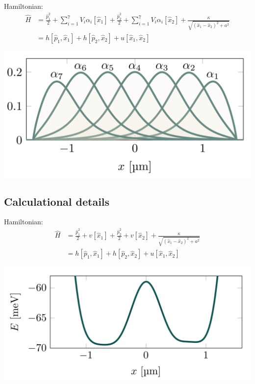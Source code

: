 \documentclass[%
oneside,                 %
final,                   %
10pt]{article}
\begin{document}
Hamiltonian:
\begin{align}
\hat{H} &=\frac{\hat{p}_1^2}{2} + \sum_{i = 1}^7 V_i\alpha_i[\hat{x}_1] + \frac{\hat{p}_2^2}{2} + \sum_{i = 1}^7 V_i\alpha_i[\hat{x}_2] + \frac{\kappa}{\sqrt{(\hat{x}_1-\hat{x}_2)^2 + a^2}}\\
&= h[\hat{p}_1,\hat{x}_1] + h[\hat{p}_2,\hat{x}_2] + u[\hat{x}_1,\hat{x}_2]
\end{align}

\vspace{6mm}

\centerline{\includegraphics[width=0.8\linewidth]{qcfigures/well_basis.png}}

\vspace{6mm}

\subsection{Calculational details}

Hamiltonian:
\begin{align}
\hat{H} &= \frac{\hat{p}_1^2}{2} + v[\hat{x}_1] + \frac{\hat{p}_2^2}{2} + v[\hat{x}_2] + \frac{\kappa}{\sqrt{(\hat{x}_1-\hat{x}_2)^2 + a^2}}\\
&= h[\hat{p}_1,\hat{x}_1] + h[\hat{p}_2,\hat{x}_2] + u[\hat{x}_1,\hat{x}_2]
\end{align}

\vspace{6mm}

\centerline{\includegraphics[width=0.8\linewidth]{qcfigures/wells.png}}
\end{document}
